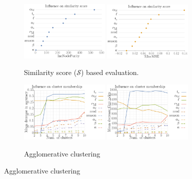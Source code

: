 \documentclass[10pt]{article}
\newcommand{\similarity}{\mathcal{S}}
\theoremstyle{definition}
\begin{document}
\begin{figure}[t]
\centering
\begin{subfigure}[b]{\textwidth}
    \includegraphics[width=0.47\textwidth]{../cellular_automata/results/rf/rf_importance_all_mdi.pdf}
    \includegraphics[width=0.47\textwidth]{../cellular_automata/results/rf/rf_importance_all_mse.pdf}
    \caption{Similarity score ($\similarity$) based evaluation. \label{fig:rfA}}
\end{subfigure}
\begin{subfigure}[b]{\textwidth}
    \includegraphics[width=0.47\textwidth]{../clustering/results/agglomerative/rf_k_agglomerative_mse.pdf}
    \includegraphics[width=0.47\textwidth]{../clustering/results/agglomerative/rf_k_agglomerative_mdg.pdf}
    \caption{Agglomerative clustering\label{fig:rfA}}
\end{subfigure}

\end{figure}
\end{document}

